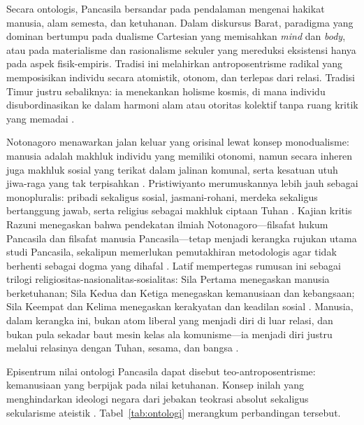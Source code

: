 \documentclass[journal]{IEEEtran}
\begin{document}
Secara ontologis, Pancasila bersandar pada pendalaman mengenai hakikat manusia, alam semesta, dan ketuhanan. Dalam diskursus Barat, paradigma yang dominan bertumpu pada dualisme Cartesian yang memisahkan \textit{mind} dan \textit{body}, atau pada materialisme dan rasionalisme sekuler yang mereduksi eksistensi hanya pada aspek fisik-empiris. Tradisi ini melahirkan antroposentrisme radikal yang memposisikan individu secara atomistik, otonom, dan terlepas dari relasi. Tradisi Timur justru sebaliknya: ia menekankan holisme kosmis, di mana individu disubordinasikan ke dalam harmoni alam atau otoritas kolektif tanpa ruang kritik yang memadai \cite{pristiwiyanto2021,notonagoro1975}.

Notonagoro menawarkan jalan keluar yang orisinal lewat konsep monodualisme: manusia adalah makhluk individu yang memiliki otonomi, namun secara inheren juga makhluk sosial yang terikat dalam jalinan komunal, serta kesatuan utuh jiwa-raga yang tak terpisahkan \cite{notonagoro1975}. Pristiwiyanto merumuskannya lebih jauh sebagai monopluralis: pribadi sekaligus sosial, jasmani-rohani, merdeka sekaligus bertanggung jawab, serta religius sebagai makhluk ciptaan Tuhan \cite{pristiwiyanto2021}. Kajian kritis Razuni menegaskan bahwa pendekatan ilmiah Notonagoro---filsafat hukum Pancasila dan filsafat manusia Pancasila---tetap menjadi kerangka rujukan utama studi Pancasila, sekalipun memerlukan pemutakhiran metodologis agar tidak berhenti sebagai dogma yang dihafal \cite{razuni2024,notonagoro1975}. Latif mempertegas rumusan ini sebagai trilogi religiositas-nasionalitas-sosialitas: Sila Pertama menegaskan manusia berketuhanan; Sila Kedua dan Ketiga menegaskan kemanusiaan dan kebangsaan; Sila Keempat dan Kelima menegaskan kerakyatan dan keadilan sosial \cite{latif2018}. Manusia, dalam kerangka ini, bukan atom liberal yang menjadi diri di luar relasi, dan bukan pula sekadar baut mesin kelas ala komunisme---ia menjadi diri justru melalui relasinya dengan Tuhan, sesama, dan bangsa \cite{madung2016,duha2022}.

Episentrum nilai ontologi Pancasila dapat disebut teo-antroposentrisme: kemanusiaan yang berpijak pada nilai ketuhanan. Konsep inilah yang menghindarkan ideologi negara dari jebakan teokrasi absolut sekaligus sekularisme ateistik \cite{latif2018,maarof2018,azra2017}. Tabel~\ref{tab:ontologi} merangkum perbandingan tersebut.
\end{document}
